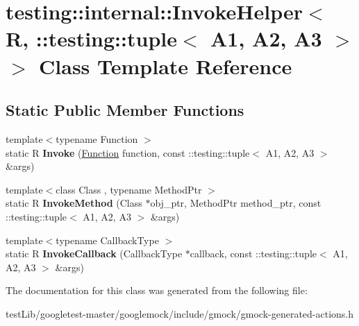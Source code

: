\hypertarget{classtesting_1_1internal_1_1InvokeHelper_3_01R_00_01_1_1testing_1_1tuple_3_01A1_00_01A2_00_01A3_01_4_01_4}{}\section{testing\+:\+:internal\+:\+:Invoke\+Helper$<$ R, \+:\+:testing\+:\+:tuple$<$ A1, A2, A3 $>$ $>$ Class Template Reference}
\label{classtesting_1_1internal_1_1InvokeHelper_3_01R_00_01_1_1testing_1_1tuple_3_01A1_00_01A2_00_01A3_01_4_01_4}
\subsection*{Static Public Member Functions}
\begin{DoxyCompactItemize}
\item 
\mbox{\label{classtesting_1_1internal_1_1InvokeHelper_3_01R_00_01_1_1testing_1_1tuple_3_01A1_00_01A2_00_01A3_01_4_01_4_a8461645c6bcfb49e465fcfbeb38cd685}} 
{\footnotesize template$<$typename Function $>$ }\\static R {\bfseries Invoke} (\hyperlink{structtesting_1_1internal_1_1Function}{Function} function, const \+::testing\+::tuple$<$ A1, A2, A3 $>$ \&args)
\item 
\mbox{\label{classtesting_1_1internal_1_1InvokeHelper_3_01R_00_01_1_1testing_1_1tuple_3_01A1_00_01A2_00_01A3_01_4_01_4_a6b2473ea7c58ff4c2ed46c7117fa7baa}} 
{\footnotesize template$<$class Class , typename Method\+Ptr $>$ }\\static R {\bfseries Invoke\+Method} (Class $\ast$obj\+\_\+ptr, Method\+Ptr method\+\_\+ptr, const \+::testing\+::tuple$<$ A1, A2, A3 $>$ \&args)
\item 
\mbox{\label{classtesting_1_1internal_1_1InvokeHelper_3_01R_00_01_1_1testing_1_1tuple_3_01A1_00_01A2_00_01A3_01_4_01_4_a4b2b3002d1c4a9b0891568bdd4da1a87}} 
{\footnotesize template$<$typename Callback\+Type $>$ }\\static R {\bfseries Invoke\+Callback} (Callback\+Type $\ast$callback, const \+::testing\+::tuple$<$ A1, A2, A3 $>$ \&args)
\end{DoxyCompactItemize}


The documentation for this class was generated from the following file\+:\begin{DoxyCompactItemize}
\item 
test\+Lib/googletest-\/master/googlemock/include/gmock/gmock-\/generated-\/actions.\+h\end{DoxyCompactItemize}
